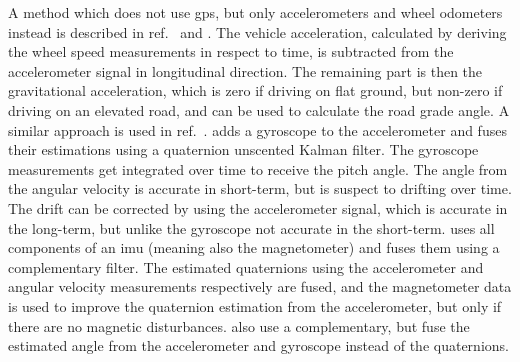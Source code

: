 A method which does not use \gls{gps}, but only accelerometers and wheel odometers instead is described in ref.~\cite{Nilsson2012} and \cite{Palella2016}.
The vehicle acceleration, calculated by deriving the wheel speed measurements in respect to time, is subtracted from the accelerometer signal in longitudinal direction.
The remaining part is then the gravitational acceleration, which is zero if driving on flat ground, but non-zero if driving on an elevated road, and can be used to calculate the road grade angle.
A similar approach is used in ref.~\cite{Sentouh2008}.
\cite{He2020} adds a gyroscope to the accelerometer and fuses their estimations using a quaternion unscented Kalman filter.
The gyroscope measurements get integrated over time to receive the pitch angle.
The angle from the angular velocity is accurate in short-term, but is suspect to drifting over time.
The drift can be corrected by using the accelerometer signal, which is accurate in the long-term, but unlike the gyroscope not accurate in the short-term.
\cite{Wu2016} uses all components of an \gls{imu} (meaning also the magnetometer) and fuses them using a complementary filter.
The estimated quaternions using the accelerometer and angular velocity measurements respectively are fused, and the magnetometer data is used to improve the quaternion estimation from the accelerometer, but only if there are no magnetic disturbances.
\cite{Euston2008,Jauch2018} also use a complementary, but fuse the estimated angle from the accelerometer and gyroscope instead of the quaternions.



